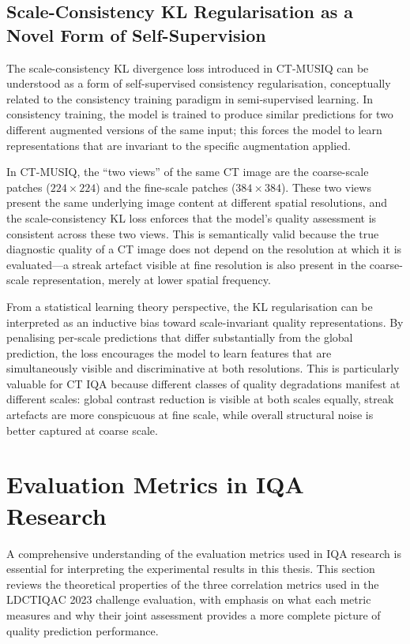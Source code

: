\subsection{Scale-Consistency KL Regularisation as a Novel Form of Self-Supervision}

The scale-consistency KL divergence loss introduced in CT-MUSIQ can be understood as a
form of self-supervised consistency regularisation, conceptually related to the
consistency training paradigm in semi-supervised learning. In consistency training,
the model is trained to produce similar predictions for two different augmented versions
of the same input; this forces the model to learn representations that are invariant
to the specific augmentation applied.

In CT-MUSIQ, the ``two views'' of the same CT image are the coarse-scale patches
($224 \times 224$) and the fine-scale patches ($384 \times 384$). These two views
present the same underlying image content at different spatial resolutions, and the
scale-consistency KL loss enforces that the model's quality assessment is consistent
across these two views. This is semantically valid because the true diagnostic quality
of a CT image does not depend on the resolution at which it is evaluated---a streak
artefact visible at fine resolution is also present in the coarse-scale representation,
merely at lower spatial frequency.

From a statistical learning theory perspective, the KL regularisation can be interpreted
as an inductive bias toward scale-invariant quality representations. By penalising
per-scale predictions that differ substantially from the global prediction, the loss
encourages the model to learn features that are simultaneously visible and discriminative
at both resolutions. This is particularly valuable for CT IQA because different classes
of quality degradations manifest at different scales: global contrast reduction is
visible at both scales equally, streak artefacts are more conspicuous at fine scale,
while overall structural noise is better captured at coarse scale.


\section{Evaluation Metrics in IQA Research}
\label{sec:lit_metrics}

A comprehensive understanding of the evaluation metrics used in IQA research is
essential for interpreting the experimental results in this thesis. This section reviews
the theoretical properties of the three correlation metrics used in the LDCTIQAC 2023
challenge evaluation, with emphasis on what each metric measures and why their joint
assessment provides a more complete picture of quality prediction performance.

